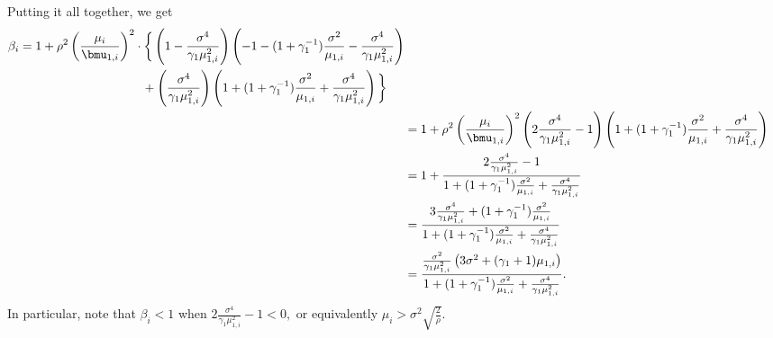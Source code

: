 Putting it all together, we get
\begin{align*}
    \begin{split}
    \beta_i
        &=
            1
            +
            \rho^2
            \left(
                \frac{\mu_i}{\bmu_{1,i}}
            \right)^2 
            \cdot
            \bigg\{
                \left(
                    1
                    -
                    \frac{\sigma^4}{\gamma_1 \mu_{1,i}^2}
                \right)
                \left(
                    -
                    1
                    -
                    (1 + \gamma_1^{-1})
                    \frac{\sigma^2}{\mu_{1,i}}
                    -
                    \frac{\sigma^4}{\gamma_1 \mu_{1,i}^2}
                \right) \\
            &\qquad\qquad\qquad\qquad\qquad+
                \left(
                    \frac{\sigma^4}{\gamma_1 \mu_{1,i}^2}
                \right)
                \left(
                    1
                    +
                    (1 + \gamma_1^{-1})
                    \frac{\sigma^2}{\mu_{1,i}}
                    +
                    \frac{\sigma^4}{\gamma_1 \mu_{1,i}^2}
                \right)
            \bigg\}
    \end{split} \\
    &=
        1
        +
        \rho^2
        \left(
            \frac{\mu_i}{\bmu_{1,i}}
        \right)^2
        \left(
            2
            \frac{\sigma^4}{\gamma_1 \mu_{1,i}^2}
            -
            1
        \right)
        \left(
            1
            +
            (1 + \gamma_1^{-1})
            \frac{\sigma^2}{\mu_{1,i}}
            +
            \frac{\sigma^4}{\gamma_1 \mu_{1,i}^2}
        \right) \\
    &=
        1
        +
        \frac{2 \frac{\sigma^4}{\gamma_1 \mu_{1,i}^2} - 1}
             {
                1
                +
                (1 + \gamma_1^{-1})
                \frac{\sigma^2}{\mu_{1,i}}
                +
                \frac{\sigma^4}{\gamma_1 \mu_{1,i}^2}
             } \\
    &=
        \frac{ 3 \frac{\sigma^4}{\gamma_1 \mu_{1,i}^2} 
               +
               (1 + \gamma_1^{-1})
               \frac{\sigma^2}{\mu_{1,i}}
             }
             {
                1
                +
                (1 + \gamma_1^{-1})
                \frac{\sigma^2}{\mu_{1,i}}
                +
                \frac{\sigma^4}{\gamma_1 \mu_{1,i}^2}
             } \\
    &=
        \frac{
            \frac{\sigma^2}{\gamma_1 \mu_{1,i}^2}
            \left(
                3 \sigma^2
                +
                (\gamma_1 + 1)
                \mu_{1,i}
            \right)
        }
        {
            1
            +
            (1 + \gamma_1^{-1})
            \frac{\sigma^2}{\mu_{1,i}}
            +
            \frac{\sigma^4}{\gamma_1 \mu_{1,i}^2}
        }.
\end{align*}
In particular, note that $\beta_i < 1$ when
\(
    2 \frac{\sigma^4}{\gamma_1 \mu_{1,i}^2} - 1 < 0,
\)
or equivalently
\(
    \mu_i > \sigma^2 \sqrt{\frac{2}{\rho}}.
\)
